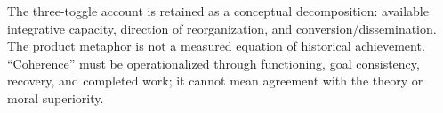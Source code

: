 The three-toggle account is retained as a conceptual decomposition: available integrative capacity, direction of reorganization, and conversion/dissemination. The product metaphor is not a measured equation of historical achievement. “Coherence” must be operationalized through functioning, goal consistency, recovery, and completed work; it cannot mean agreement with the theory or moral superiority.
